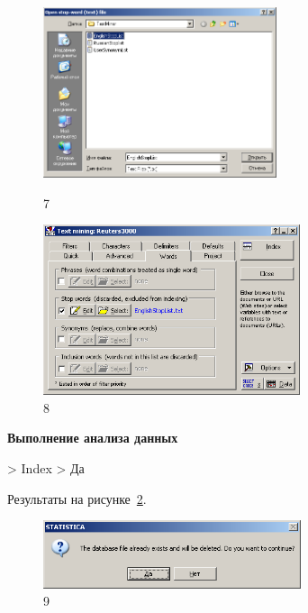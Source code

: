 \begin{figure}[!h]
  \centering

  \begin{minipage}{0.49\textwidth}
    \centering

    \includegraphics[height=5cm]
    {inc/7.PNG}

    \caption{7}

    \label{fig:7}
  \end{minipage}
  \begin{minipage}{0.49\textwidth}
    \centering

    \includegraphics[height=5cm]
    {inc/8.PNG}

    \caption{8}

    \label{fig:8}
  \end{minipage}
\end{figure}

\newpage

\begin{center}
  \textbf{Выполнение анализа данных}
\end{center}

> Index > Да

Результаты на рисунке~\ref{fig:9}.

\begin{figure}[!h]
  \centering

  \includegraphics[height=2cm]
  {inc/9.PNG}

  \caption{9}

  \label{fig:9}
\end{figure}


